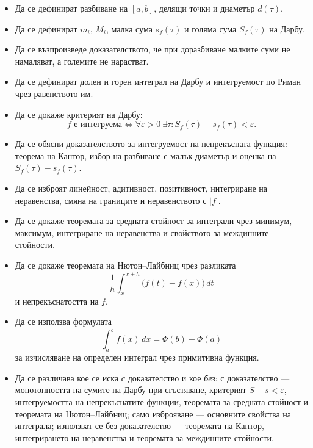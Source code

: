 \begin{itemize}
\item Да се дефинират разбиване на $[a,b]$, делящи точки и диаметър $d(\tau)$.
\item Да се дефинират $m_i$, $M_i$, малка сума $s_f(\tau)$ и голяма сума $S_f(\tau)$ на Дарбу.
\item Да се възпроизведе доказателството, че при доразбиване малките суми не намаляват, а големите не нарастват.
\item Да се дефинират долен и горен интеграл на Дарбу и интегруемост по Риман чрез равенството им.
\item Да се докаже критерият на Дарбу:
\[
f\text{ е интегруема}
\Longleftrightarrow
\forall\varepsilon>0\ \exists\tau:
S_f(\tau)-s_f(\tau)<\varepsilon.
\]
\item Да се обясни доказателството за интегруемост на непрекъсната функция: теорема на Кантор, избор на разбиване с малък диаметър и оценка на $S_f(\tau)-s_f(\tau)$.
\item Да се изброят линейност, адитивност, позитивност, интегриране на неравенства, смяна на границите и неравенството с $|f|$.
\item Да се докаже теоремата за средната стойност за интеграли чрез минимум, максимум, интегриране на неравенства и свойството за междинните стойности.
\item Да се докаже теоремата на Нютон--Лайбниц чрез разликата
\[
\frac{1}{h}\int_x^{x+h}\bigl(f(t)-f(x)\bigr)\,dt
\]
и непрекъснатостта на $f$.
\item Да се използва формулата
\[
\int_a^b f(x)\,dx=\Phi(b)-\Phi(a)
\]
за изчисляване на определен интеграл чрез примитивна функция.
\item Да се различава кое се иска \emph{с} доказателство и кое \emph{без}:
с доказателство --- монотонността на сумите на Дарбу при сгъстяване, критерият
$S-s<\varepsilon$, интегруемостта на непрекъснатите функции, теоремата за
средната стойност и теоремата на Нютон--Лайбниц; само изброяване --- основните
свойства на интеграла; използват се без доказателство --- теоремата на Кантор,
интегрирането на неравенства и теоремата за междинните стойности.
\end{itemize}
